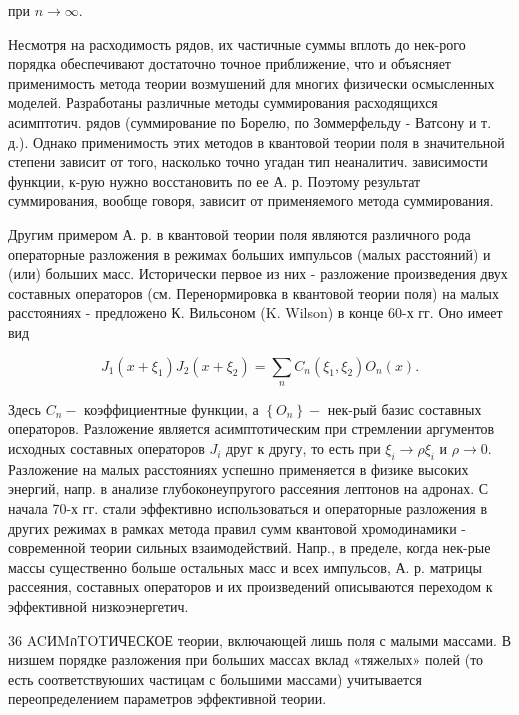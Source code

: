 \documentclass[10pt]{article}
\begin{document}
при $n \rightarrow \infty$.



Несмотря на расходимость рядов, их частичные суммы вплоть до нек-рого порядка обеспечивают достаточно точное приближение, что и объясняет применимость метода теории возмушений для многих физически осмысленных моделей. Разработаны различные методы суммирования расходящихся асимптотич. рядов (суммирование по Борелю, по Зоммерфельду - Ватсону и т. д.). Однако применимость этих методов в квантовой теории поля в значительной степени зависит от того, насколько точно угадан тип неаналитич. зависимости функции, к-рую нужно восстановить по ее А. р. Поэтому результат суммирования, вообще говоря, зависит от применяемого метода суммирования.



Другим примером А. р. в квантовой теории поля являются различного рода операторные разложения в режимах больших импульсов (малых расстояний) и (или) больших масс. Исторически первое из них - разложение произведения двух составных операторов (см. Перенормировка в квантовой теории поля) на малых расстояниях - предложено К. Вильсоном (K. Wilson) в конце 60-х гг. Оно имеет вид



\[

J_{1}\left(x+\xi_{1}\right) J_{2}\left(x+\xi_{2}\right)=\sum_{n} C_{n}\left(\xi_{1}, \xi_{2}\right) O_{n}(x) .

\]



Здесь $C_{n}-$ коэффициентные функции, а $\left\{O_{n}\right\}-$ нек-рый базис составных операторов. Разложение является асимптотическим при стремлении аргументов исходных составных операторов $J_{i}$ друг к другу, то есть при $\xi_{i} \rightarrow \rho \xi_{i}$ и $\rho \rightarrow 0$. Разложение на малых расстояниях успешно применяется в физике высоких энергий, напр. в анализе глубоконеупругого рассеяния лептонов на адронах. С начала 70-х гг. стали эффективно использоваться и операторные разложения в других режимах в рамках метода правил сумм квантовой хромодинамики - современной теории сильных взаимодействий. Напр., в пределе, когда нек-рые массы существенно больше остальных масс и всех импульсов, А. р. матрицы рассеяния, составных операторов и их произведений описываются переходом к эффективной низкоэнергетич.



36 ACИMกTOTИЧЕСКОЕ теории, включающей лишь поля с малыми массами. В низшем порядке разложения при больших массах вклад «тяжелых» полей (то есть соответствуюших частицам с большими массами) учитывается переопределением параметров эффективной теории.
\end{document}
